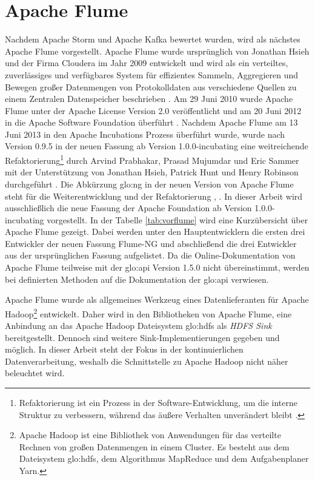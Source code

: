 \section{Apache Flume}

Nachdem Apache Storm und Apache Kafka bewertet wurden, wird als nächstes Apache Flume vorgestellt. Apache Flume wurde ursprünglich von Jonathan Hsieh und der Firma Cloudera im Jahr 2009 entwickelt und wird als ein verteiltes, zuverlässiges und verfügbares System für effizientes Sammeln, Aggregieren und Bewegen großer Datenmengen von Protokolldaten aus verschiedene Quellen zu einem Zentralen Datenspeicher beschrieben . Am 29 Juni 2010 wurde Apache Flume unter der Apache License Version 2.0 veröffentlicht und am 20 Juni 2012 in die Apache Software Foundation überführt . Nachdem Apache Flume am 13 Juni 2013 in den Apache Incubations Prozess überführt wurde, wurde nach Version 0.9.5 in der neuen Fassung ab Version 1.0.0-incubating eine weitreichende Refaktorierung\footnote{Refaktorierung ist ein Prozess in der Software-Entwicklung, um die interne Struktur zu verbessern, während das äußere Verhalten unverändert bleibt .} durch Arvind Prabhakar, Prasad Mujumdar und Eric Sammer mit der Unterstützung von Jonathan Hsieh, Patrick Hunt und Henry Robinson durchgeführt . Die Abkürzung \gls{glo:ng} in der neuen Version von Apache Flume steht für die Weiterentwicklung und der Refaktorierung , . In dieser Arbeit wird ausschließlich die neue Fassung der Apache Foundation ab Version 1.0.0-incubating vorgestellt. In der Tabelle \ref{tab:vorflume} wird eine Kurzübersicht über Apache Flume gezeigt. Dabei werden unter den Hauptentwicklern die ersten drei Entwickler der neuen Fassung Flume-NG und abschließend die drei Entwickler aus der ursprünglichen Fassung aufgelistet. Da die Online-Dokumentation von Apache Flume teilweise mit der \gls{glo:api} Version 1.5.0 nicht übereinstimmt, werden bei definierten Methoden auf die Dokumentation der \gls{glo:api} verwiesen.

Apache Flume wurde als allgemeines Werkzeug eines Datenlieferanten für Apache Hadoop\footnote{Apache Hadoop ist eine Bibliothek von Anwendungen für das verteilte Rechnen von großen Datenmengen in einem Cluster. Es besteht aus dem Dateisystem \gls{glo:hdfs}, dem Algorithmus MapReduce und dem Aufgabenplaner Yarn. } entwickelt. Daher wird in den Bibliotheken von Apache Flume, eine Anbindung an das Apache Hadoop Dateisystem \gls{glo:hdfs} als \textit{HDFS Sink} bereitgestellt. Dennoch sind weitere Sink-Implementierungen gegeben und möglich. In dieser Arbeit steht der Fokus in der kontinuierlichen Datenverarbeitung, weshalb die Schnittstelle zu Apache Hadoop nicht näher beleuchtet wird. 

